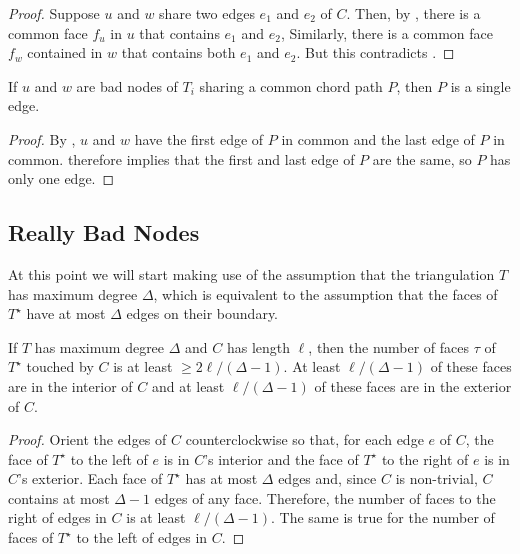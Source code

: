 \documentclass{patmorin}
\newcommand{\dual}[1]{{#1}^\star}
\begin{document}
\begin{proof}
   Suppose $u$ and $w$ share two edges $e_1$ and $e_2$ of $C$.  Then,
   by , there is a common face $f_u$ in $u$ that
   contains $e_1$ and $e_2$, Similarly, there is a common face $f_w$
   contained in $w$ that contains both $e_1$ and $e_2$.  But this
   contradicts .
\end{proof}


\begin{lem}
   If $u$ and $w$ are bad nodes of $T_i$ sharing a common chord path $P$,
   then $P$ is a single edge.
\end{lem}

\begin{proof}
   By , $u$ and $w$ have the first edge of $P$ in
   common and the last edge of $P$ in common.  
   therefore implies that the first and last edge of $P$ are the same,
   so $P$ has only one edge.
\end{proof}

\subsection{Really Bad Nodes}


At this point we will start making use of the assumption that the
triangulation $T$ has maximum degree $\Delta$, which is equivalent to
the assumption that the faces of $\dual{T}$ have at most $\Delta$ edges
on their boundary.

\begin{obs}
  If $T$ has maximum degree $\Delta$ and $C$ has length $\ell$, then
  the number of faces $\tau$ of $\dual{T}$ touched by $C$ is at least $\ge
  2\ell/(\Delta-1)$.  At least $\ell/(\Delta-1)$ of these faces are in
  the interior of $C$ and at least $\ell/(\Delta-1)$ of these faces are
  in the exterior of $C$.
\end{obs}

\begin{proof}
  Orient the edges of $C$ counterclockwise so that, for each edge
  $e$ of $C$, the face of $\dual{T}$ to the left of $e$ is in $C$'s
  interior and the face of $\dual{T}$ to the right of $e$ is in $C$'s
  exterior.  Each face of $\dual{T}$ has at most $\Delta$ edges and,
  since $C$ is non-trivial, $C$ contains at most $\Delta-1$ edges of any
  face. Therefore, the number of faces to the right of edges in $C$ is
  at least $\ell/(\Delta-1)$. The same is true for the number of faces
  of $\dual{T}$ to the left of edges in $C$.
\end{proof}
\end{document}
